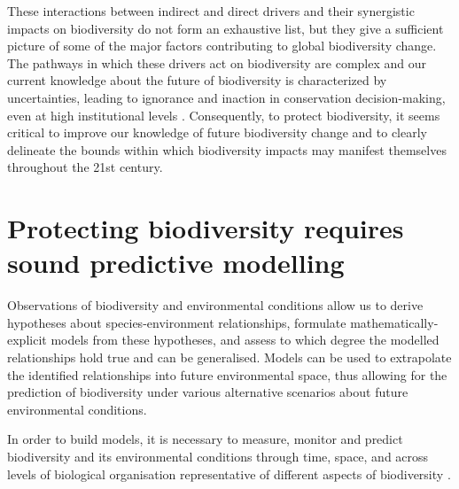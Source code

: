 These interactions between indirect and direct drivers and their synergistic impacts on biodiversity do not form an exhaustive list, but they give a sufficient picture of some of the major factors contributing to global biodiversity change. The pathways in which these drivers act on biodiversity are complex and our current knowledge about the future of biodiversity is characterized by uncertainties, leading to ignorance and inaction in conservation decision-making, even at high institutional levels \citep{voigt2019international}. Consequently, to protect biodiversity, it seems critical to improve our knowledge of future biodiversity change and to clearly delineate the bounds within which biodiversity impacts may manifest themselves throughout the 21st century.


\section{Protecting biodiversity requires sound predictive modelling}

Observations of biodiversity and environmental conditions allow us to derive hypotheses about species-environment relationships, formulate mathematically-explicit models from these hypotheses, and assess to which degree the modelled relationships hold true and can be generalised. Models can be used to extrapolate the identified relationships into future environmental space, thus allowing for the prediction of biodiversity under various alternative scenarios about future environmental conditions. 

In order to build models, it is necessary to measure, monitor and predict biodiversity and its environmental conditions through time, space, and across levels of biological organisation representative of different aspects of biodiversity \citep[from genetic diversity to ecosystem function,][]{kissling_building_2017, ipbes_summary_2016}.

